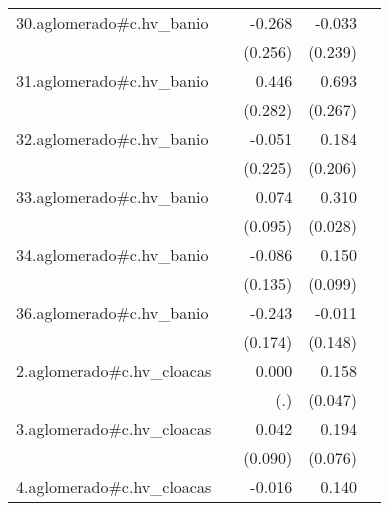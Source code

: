 {\begin{longtable}{l*{4}{D{.}{.}{-1}}}
\addlinespace
30.aglomerado#c.hv\_banio&                     &      -0.268         &      -0.033         &                     \\
            &                     &     (0.256)         &     (0.239)         &                     \\
\addlinespace
31.aglomerado#c.hv\_banio&                     &       0.446         &       0.693\sym{**} &                     \\
            &                     &     (0.282)         &     (0.267)         &                     \\
\addlinespace
32.aglomerado#c.hv\_banio&                     &      -0.051         &       0.184         &                     \\
            &                     &     (0.225)         &     (0.206)         &                     \\
\addlinespace
33.aglomerado#c.hv\_banio&                     &       0.074         &       0.310\sym{***}&                     \\
            &                     &     (0.095)         &     (0.028)         &                     \\
\addlinespace
34.aglomerado#c.hv\_banio&                     &      -0.086         &       0.150         &                     \\
            &                     &     (0.135)         &     (0.099)         &                     \\
\addlinespace
36.aglomerado#c.hv\_banio&                     &      -0.243         &      -0.011         &                     \\
            &                     &     (0.174)         &     (0.148)         &                     \\
\addlinespace
2.aglomerado#c.hv\_cloacas&                     &       0.000         &       0.158\sym{***}&                     \\
            &                     &         (.)         &     (0.047)         &                     \\
\addlinespace
3.aglomerado#c.hv\_cloacas&                     &       0.042         &       0.194\sym{*}  &                     \\
            &                     &     (0.090)         &     (0.076)         &                     \\
\addlinespace
4.aglomerado#c.hv\_cloacas&                     &      -0.016         &       0.140\sym{***}&                     \\

\end{longtable}}
